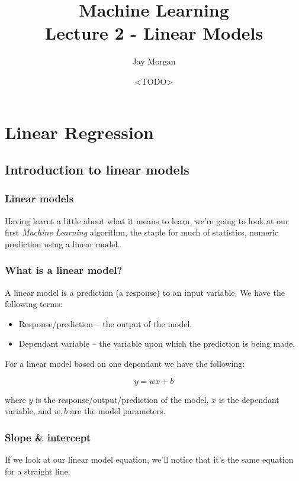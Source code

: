 \documentclass[10pt]{beamer}
\author{Jay Morgan}
\date{<TODO>}
\title{Machine Learning\\\medskip
\large Lecture 2 - Linear Models}
\begin{document}
\maketitle

\section*{Linear Regression}
\label{sec:org1aed3a6}

\subsection*{Introduction to linear models}
\label{sec:orgc4a2c3c}

\subsubsection*{Linear models}
\label{sec:orgf1c3017}

Having learnt a little about what it means to learn, we're going to look at our first
\emph{Machine Learning} algorithm, the staple for much of statistics, numeric prediction
using a linear model.

\subsubsection*{What is a linear model?}
\label{sec:org787f595}
A linear model is a prediction (a response) to an input variable. We have the
following terms:

\begin{itemize}
\item Response/prediction -- the output of the model.
\item Dependant variable -- the variable upon which the prediction is being made.
\end{itemize}

For a linear model based on one dependant we have the following:

\[
y = w x + b
\]

where \(y\) is the response/output/prediction of the model, \(x\) is the dependant
variable, and \(w, b\) are the model parameters.

\subsubsection*{Slope \& intercept}
\label{sec:org0768375}
If we look at our linear model equation, we'll notice that it's the same equation for a straight line.
\end{document}
